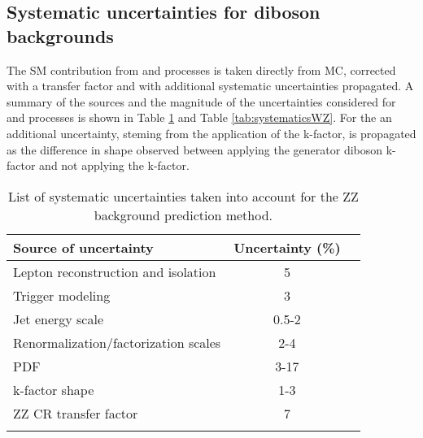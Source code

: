 \subsection*{Systematic uncertainties for diboson backgrounds}
\noindent
\justify
The SM contribution from \PWZ and \PZZ processes is taken directly from MC, corrected with a transfer factor and with additional systematic uncertainties propagated.
A summary of the sources and the magnitude of the uncertainties considered for \PZZ and \PWZ processes is shown in Table \ref{tab:systematicsZZ} and Table \ref{tab:systematicsWZ}.
For the \PZZ an additional uncertainty, steming from the application of the k-factor, is propagated as the difference in shape observed between applying the generator diboson \pt k-factor and not applying the k-factor.
\begin{table}[!hbtp]
\renewcommand{\arraystretch}{1.2}
\setlength{\belowcaptionskip}{6pt}
\small
\centering
\caption{
List of systematic uncertainties taken into account for the ZZ background prediction method.}
\begin{tabular}{l c c}
\hline\hline
Source of uncertainty                         & Uncertainty (\%)     \\
\hline
Lepton reconstruction and isolation     &      {5}                   \\ %
Trigger modeling                        &      {3}                   \\ %
Jet energy scale                        &      {0.5-2}                  \\ %
Renormalization/factorization scales    &      {2-4}                 \\ %
PDF                                     &      {3-17}                 \\ %
k-factor shape                          &      {1-3}                 \\ %
ZZ CR transfer factor             &      {7}                 \\ %
\hline\hline
\label{tab:systematicsZZ}
\end{tabular}
\end{table}
